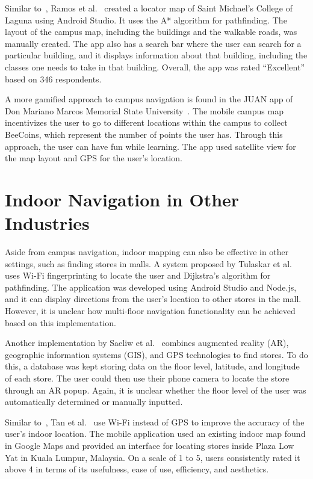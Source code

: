 Similar to~\cite{ref09}, Ramos et al.~\cite{ref10} created a locator map of
Saint Michael's College of Laguna using Android Studio. It uses the A* algorithm
for pathfinding. The layout of the campus map, including the buildings and the
walkable roads, was manually created. The app also has a search bar where the
user can search for a particular building, and it displays information about
that building, including the classes one needs to take in that building.
Overall, the app was rated ``Excellent'' based on 346 respondents.

A more gamified approach to campus navigation is found in the JUAN app of Don
Mariano Marcos Memorial State University~\cite{ref11}. The mobile campus map
incentivizes the user to go to different locations within the campus to collect
BeeCoins, which represent the number of points the user has. Through this
approach, the user can have fun while learning. The app used satellite view for
the map layout and GPS for the user's location.

\section{Indoor Navigation in Other Industries}\label{sec:2.4}

Aside from campus navigation, indoor mapping can also be effective in other
settings, such as finding stores in malls. A system proposed by Tulaskar et
al.~\cite{ref12} uses Wi-Fi fingerprinting to locate the user and Dijkstra's
algorithm for pathfinding. The application was developed using Android Studio
and Node.js, and it can display directions from the user's location to other
stores in the mall. However, it is unclear how multi-floor navigation
functionality can be achieved based on this implementation.

Another implementation by Saeliw et al.~\cite{ref13} combines augmented reality
(AR), geographic information systems (GIS), and GPS technologies to find stores.
To do this, a database was kept storing data on the floor level, latitude, and
longitude of each store. The user could then use their phone camera to locate
the store through an AR popup. Again, it is unclear whether the floor level of
the user was automatically determined or manually inputted.

Similar to~\cite{ref12}, Tan et al.~\cite{ref14} use Wi-Fi instead of GPS to
improve the accuracy of the user's indoor location. The mobile application used
an existing indoor map found in Google Maps and provided an interface for
locating stores inside Plaza Low Yat in Kuala Lumpur, Malaysia. On a scale of 1
to 5, users consistently rated it above 4 in terms of its usefulness, ease of
use, efficiency, and aesthetics.

